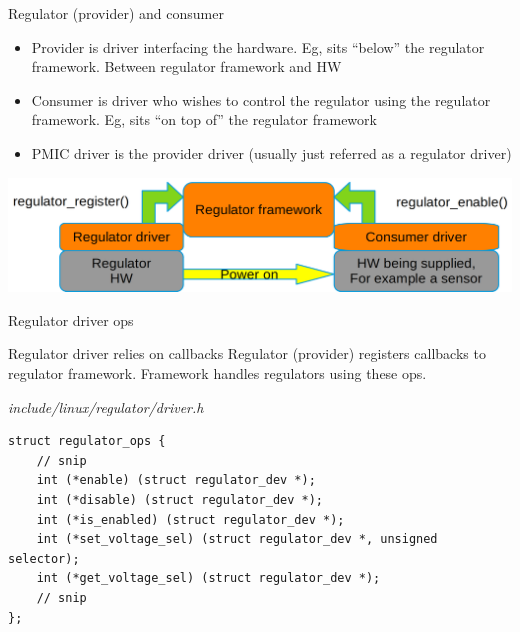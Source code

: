 \documentclass[aspectratio=169]{beamer}
\begin{document}

\begin{frame}[t]{Regulator (provider) and consumer}\vspace{4pt}


\begin{itemize}
	\item Provider is driver interfacing the hardware. Eg, sits “below” the regulator framework. Between regulator framework and HW
	\item Consumer is driver who wishes to control the regulator using the regulator framework. Eg, sits “on top of” the regulator framework
	\item PMIC driver is the provider driver (usually just referred as a regulator driver) \\[10pt]
\end{itemize}
\includegraphics[width=1\linewidth]{img/regulator_users.png}
\end{frame}

\newcommand{\mycfile}[1]{\textit{\small #1}}


\begin{frame}[fragile, t]{Regulator driver ops}\vspace{4pt}
\begin{block}{Regulator driver relies on callbacks}
Regulator (provider) registers callbacks to regulator framework.
Framework handles regulators using these ops.
\end{block}

\mycfile{include/linux/regulator/driver.h}
\lstset{language=C}
\scriptsize
\begin{lstlisting}
struct regulator_ops {
	// snip
	int (*enable) (struct regulator_dev *);
	int (*disable) (struct regulator_dev *);
	int (*is_enabled) (struct regulator_dev *);
	int (*set_voltage_sel) (struct regulator_dev *, unsigned selector);
	int (*get_voltage_sel) (struct regulator_dev *);
	// snip
};
\end{lstlisting}
\end{frame}
\end{document}

